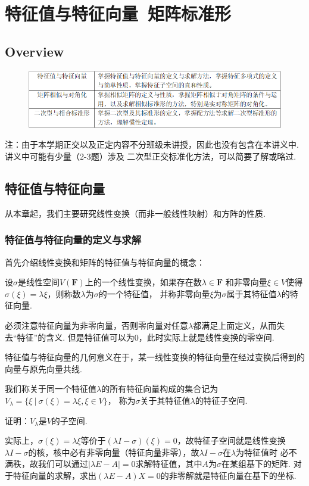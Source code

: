 \chapter{特征值与特征向量\ 矩阵标准形}

\section{Overview}
\begin{figure}[h]
	\centering
	\includegraphics[scale=0.58]{9.png}
\end{figure}
注：由于本学期正交以及正定内容不分班级未讲授，因此也没有包含在本讲义中.讲义中可能有少量（2-3题）涉及
二次型正交标准化方法，可以简要了解或略过.
\section{特征值与特征向量}
从本章起，我们主要研究线性变换（而非一般线性映射）和方阵的性质.
\subsection{特征值与特征向量的定义与求解}
首先介绍线性变换和矩阵的特征值与特征向量的概念：
\begin{definition}
	设$\sigma$是线性空间$V(\mathbf{F})$上的一个线性变换，如果存在数$\lambda\in\mathbf{F}$
	和非零向量$\xi\in V$使得$\sigma(\xi)=\lambda\xi$，则称数$\lambda$为$\sigma$的一个特征值，
	并称非零向量$\xi$为$\sigma$属于其特征值$\lambda$的特征向量.
\end{definition}
必须注意特征向量为非零向量，否则零向量对任意$\lambda$都满足上面定义，从而失去“特征”的含义.
但是特征值可以为0，此时实际上就是线性变换的零空间.

特征值与特征向量的几何意义在于，某一线性变换的特征向量在经过变换后得到的向量与原先向量共线.

我们称关于同一个特征值$\lambda$的所有特征向量构成的集合记为$V_\lambda=\{\xi\ |\ \sigma(\xi)=\lambda\xi,\xi\in V\}$，
称为$\sigma$关于其特征值$\lambda$的特征子空间.
\begin{example}
	证明：$V_\lambda$是$V$的子空间.
\end{example}
实际上，$\sigma(\xi)=\lambda\xi$等价于$(\lambda I-\sigma)(\xi)=0$，故特征子空间就是线性变换
$\lambda I-\sigma$的核，核中必有非零向量（特征向量非零），故$\lambda I-\sigma$在$\lambda$为特征值时
必不满秩，故我们可以通过$|\lambda E-A|=0$求解特征值，其中$A$为$\sigma$在某组基下的矩阵.
对于特征向量的求解，求出$(\lambda E-A)X=0$的非零解就是特征向量在基下的坐标.

